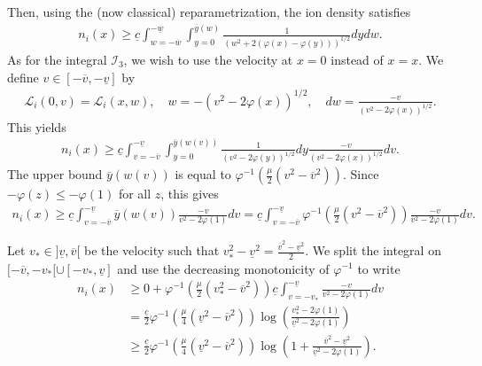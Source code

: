 \documentclass{article}
\numberwithin{equation}{section}
\newcommand{\ve}{{\overline{v}_e}} %
\newcommand{\DomLow}{{\mathcal{D}_3}} %
\newcommand{\IntLow}{{\mathcal{I}_3}} %
\newcommand{\domfel}{{\underline{v}}} %
\newcommand{\domfeu}{{\overline{v}}} %
\newcommand{\minfe}{{\underline{c}}} %
\begin{document}
Then, using the (now classical) reparametrization, the ion density satisfies
\begin{align*}
	n_i(x) \geqslant \minfe \int_{w=-\overline{w}}^{-\underline{w}} \int_{y=0}^{\overline{y}(w)} \frac{1}{\left(w^2 + 2\left(\varphi(x) - \varphi(y)\right)\right)^{1/2}} dy dw.
\end{align*}
As for the integral $\IntLow$, we wish to use the velocity at $x=0$ instead of $x=x$. We define $v\in[-\domfeu,-\domfel]$ by
\begin{align*}
	\mathcal{L}_i(0,v) = \mathcal{L}_i(x,w), \quad w = - \left(v^2 - 2 \varphi(x)\right)^{1/2}, \quad dw = \frac{- v}{\left(v^2 - 2 \varphi(x)\right)^{1/2}}.
\end{align*}
This yields
\begin{align*}
	n_i(x) \geqslant \minfe \int_{v=-\domfeu}^{-\domfel} \int_{y=0}^{\overline{y}(w(v))} \frac{1}{\left(v^2 - 2\varphi(y)\right)^{1/2}} dy  \frac{-v}{\left(v^2 - 2 \varphi(x)\right)^{1/2}} dv.
\end{align*}
The upper bound $\overline{y}(w(v))$ is equal to $\varphi^{-1}\left(\frac{\mu}{2}\left(v^2 - \domfeu^2\right)\right)$.
Since $-\varphi(z) \leqslant -\varphi(1)$ for all $z$, this gives
\begin{align*}
	n_i(x) \geqslant \minfe \int_{v=-\domfeu}^{-\domfel} \overline{y}(w(v)) \frac{-v}{v^2 - 2\varphi(1)} dv = \minfe \int_{v=-\domfeu}^{-\domfel} \varphi^{-1}\left(\frac{\mu}{2}\left(v^2 - \domfeu^2\right)\right) \frac{-v}{v^2 - 2\varphi(1)} dv.
\end{align*}

Let $v_* \in ]\domfel,\domfeu[$ be the velocity such that $v_*^2 - \domfel^2 = \frac{\domfeu^2 - \domfel^2}{2}$. We split the integral on $[-\domfeu,-v_*[ \cup [-v_*,\domfel]$ and use the decreasing monotonicity of $\varphi^{-1}$ to write
\begin{align*}
	n_i(x) 
	&\geqslant 0 + \varphi^{-1}\left(\frac{\mu}{2}\left(v_*^2 - \domfeu^2\right)\right) \minfe \int_{v=-v_*}^{-\domfel} \frac{-v}{v^2 - 2\varphi(1)} dv \\
	&= \frac{\minfe}{2} \varphi^{-1}\left(\frac{\mu}{4}\left(\domfel^2 - \domfeu^2\right)\right) \log\left(\frac{v_*^2 - 2 \varphi(1)}{\domfel^2 - 2 \varphi(1)}\right) \\
	&\geqslant \frac{\minfe}{2} \varphi^{-1}\left(\frac{\mu}{4}\left(\domfel^2 - \domfeu^2\right)\right) \log\left(1 + \frac{\domfeu^2 - \domfel^2}{\domfel^2 - 2 \varphi(1)}\right).
\end{align*}





%
%
\end{document}
